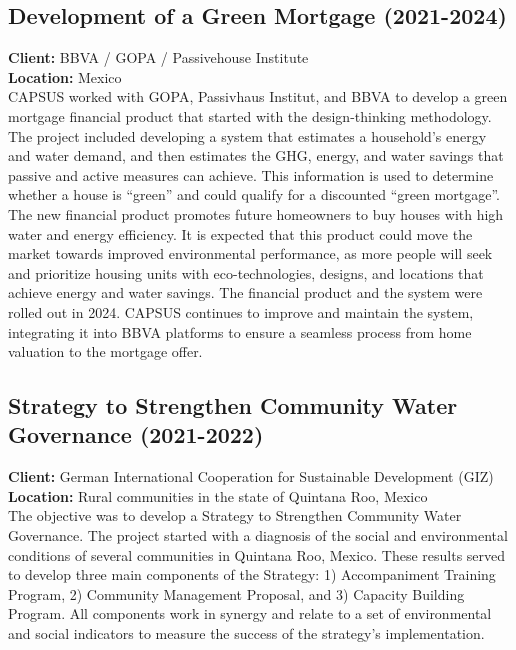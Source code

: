 \documentclass[
	a4paper,
	12pt,
	unnumberedsections,
]{CSSullivanBusinessReport}
\begin{document}
\subsection{Development of a Green Mortgage (2021-2024)}
\textbf{Client:}  BBVA / GOPA / Passivehouse Institute \\
\textbf{Location:}  Mexico \\[0.5em]
 CAPSUS worked with GOPA, Passivhaus Institut, and BBVA to develop a green mortgage financial product that started with the design-thinking methodology. The project included developing a system that estimates a household's energy and water demand, and then estimates the GHG, energy, and water savings that passive and active measures can achieve. This information is used to determine whether a house is “green” and could qualify for a discounted “green mortgage”. The new financial product promotes future homeowners to buy houses with high water and energy efficiency. It is expected that this product could move the market towards improved environmental performance, as more people will seek and prioritize housing units with eco-technologies, designs, and locations that achieve energy and water savings. The financial product and the system were rolled out in 2024. CAPSUS continues to improve and maintain the system, integrating it into BBVA platforms to ensure a seamless process from home valuation to the mortgage offer.

\subsection{Strategy to Strengthen Community Water Governance (2021-2022)}
\textbf{Client:}  German International Cooperation for Sustainable Development (GIZ) \\
\textbf{Location:}  Rural communities in the state of Quintana Roo, Mexico  \\[0.5em]
 The objective was to develop a Strategy to Strengthen Community Water Governance. The project started with a diagnosis of the social and environmental conditions of several communities in Quintana Roo, Mexico. These results served to develop three main components of the Strategy: 1) Accompaniment Training Program, 2) Community Management Proposal, and 3) Capacity Building Program. All components work in synergy and relate to a set of environmental and social indicators to measure the success of the strategy’s implementation.
\end{document}
